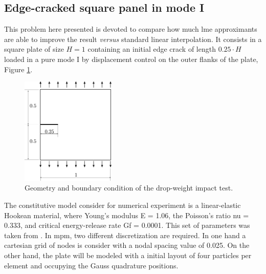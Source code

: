 \message{ !name(2020_EFM_MPM_Eigensoftening.tex)}\documentclass[preprint,12pt,a4paper]{elsarticle}
\begin{document}
\subsection{Edge-cracked square panel in mode I}
\label{sec:3.1}

This problem here presented is devoted to compare how much \acrshort{lme}
approximants are able to improve the result \textit{versus} standard
linear interpolation. It consists in a square plate of size $H = 1$ containing
an initial edge crack of length $0.25 \cdot H$ loaded in a pure mode I
by displacement control on the outer flanks of the plate, Figure
\ref{fig:geometry-cracked-panel-mode-I}.
\begin{figure}
  \centering
  \includegraphics[width=0.4\textwidth]{Figure-Mode_I}
  \caption{Geometry and boundary condition of the drop-weight impact test.}
  \label{fig:geometry-cracked-panel-mode-I}
\end{figure}
The constitutive model consider for numerical experiment is a
linear-elastic Hookean material, where Young's modulus \gls{E} = 1.06, the
Poisson's ratio \gls{nu} = 0.333, and critical energy-release rate
\gls{Gf} = 0.0001. This set of parameters was taken from \cite{Pandolfi_2012}. In
\acrshort{mpm}, two different discretization are required. In one hand
a cartesian grid of nodes is consider with a nodal spacing value of
0.025. On the other hand, the plate will be modeled with a initial
layout of four particles per element and occupying the Gauss quadrature
positions.\\
\end{document}
